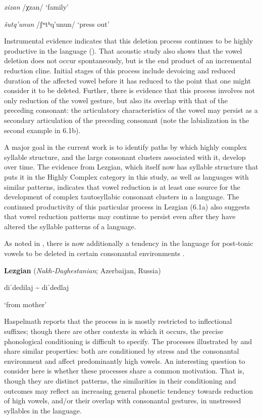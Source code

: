\textit{xizan}      /χzan/      ‘family’

\textit{šutq’unun}    /ʃʷtʰq’unun/    ‘press out’

\citep[36-8]{Haspelmath1993}
\z

  Instrumental evidence indicates that this deletion process continues to be highly productive in the language (\citealt{ChitoranBabaliyeva2007}). That acoustic study also shows that the vowel deletion does not occur spontaneously, but is the end product of an incremental reduction cline. Initial stages of this process include devoicing and reduced duration of the affected vowel before it has reduced to the point that one might consider it to be deleted. Further, there is evidence that this process involves not only reduction of the vowel gesture, but also its overlap with that of the preceding consonant: the articulatory characteristics of the vowel may persist as a secondary articulation of the preceding consonant (note the labialization in the second example in 6.1b).

  A major goal in the current work is to identify paths by which highly complex syllable structure, and the large consonant clusters associated with it, develop over time. The evidence from Lezgian, which itself now has syllable structure that puts it in the Highly Complex category in this study, as well as languages with similar patterns, indicates that vowel reduction is at least one source for the development of complex tautosyllabic consonant clusters in a language. The continued productivity of this particular process in Lezgian (6.1a) also suggests that vowel reduction patterns may continue to persist even after they have altered the syllable patterns of a language. 

  As noted in , there is now additionally a tendency in the language for post-tonic vowels to be deleted in certain consonantal environments .

\ea\label{ex:(6.2)}
  \textbf{Lezgian} (\textit{Nakh-Daghestanian}; Azerbaijan, Russia)

diˈdedilaj {\textasciitilde} diˈdedlaj

\glt ‘from mother’

\citep[40]{Haspelmath1993}

\z

Haspelmath reports that the process in  is mostly restricted to inflectional suffixes; though there are other contexts in which it occurs, the precise phonological conditioning is difficult to specify. The processes illustrated by  and  share similar properties: both are conditioned by stress and the consonantal environment and affect predominantly high vowels. An interesting question to consider here is whether these processes share a common motivation. That is, though they are distinct patterns, the similarities in their conditioning and outcomes may reflect an increasing general phonetic tendency towards reduction of high vowels, and/or their overlap with consonantal gestures, in unstressed syllables in the language.

